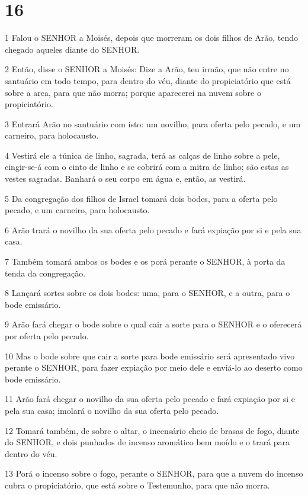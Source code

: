 \chapter{16}

\par 1 Falou o SENHOR a Moisés, depois que morreram os dois filhos de Arão, tendo chegado aqueles diante do SENHOR.
\par 2 Então, disse o SENHOR a Moisés: Dize a Arão, teu irmão, que não entre no santuário em todo tempo, para dentro do véu, diante do propiciatório que está sobre a arca, para que não morra; porque aparecerei na nuvem sobre o propiciatório.
\par 3 Entrará Arão no santuário com isto: um novilho, para oferta pelo pecado, e um carneiro, para holocausto.
\par 4 Vestirá ele a túnica de linho, sagrada, terá as calças de linho sobre a pele, cingir-se-á com o cinto de linho e se cobrirá com a mitra de linho; são estas as vestes sagradas. Banhará o seu corpo em água e, então, as vestirá.
\par 5 Da congregação dos filhos de Israel tomará dois bodes, para a oferta pelo pecado, e um carneiro, para holocausto.
\par 6 Arão trará o novilho da sua oferta pelo pecado e fará expiação por si e pela sua casa.
\par 7 Também tomará ambos os bodes e os porá perante o SENHOR, à porta da tenda da congregação.
\par 8 Lançará sortes sobre os dois bodes: uma, para o SENHOR, e a outra, para o bode emissário.
\par 9 Arão fará chegar o bode sobre o qual cair a sorte para o SENHOR e o oferecerá por oferta pelo pecado.
\par 10 Mas o bode sobre que cair a sorte para bode emissário será apresentado vivo perante o SENHOR, para fazer expiação por meio dele e enviá-lo ao deserto como bode emissário.
\par 11 Arão fará chegar o novilho da sua oferta pelo pecado e fará expiação por si e pela sua casa; imolará o novilho da sua oferta pelo pecado.
\par 12 Tomará também, de sobre o altar, o incensário cheio de brasas de fogo, diante do SENHOR, e dois punhados de incenso aromático bem moído e o trará para dentro do véu.
\par 13 Porá o incenso sobre o fogo, perante o SENHOR, para que a nuvem do incenso cubra o propiciatório, que está sobre o Testemunho, para que não morra.
